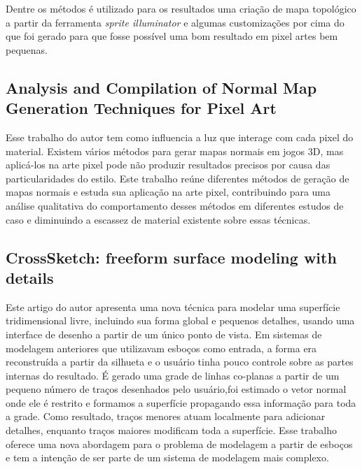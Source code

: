 Dentre os métodos é utilizado para os resultados uma criação de mapa topológico a partir da ferramenta \textit{sprite illuminator} e algumas customizações por cima do que foi gerado para que fosse possível uma bom resultado em pixel artes bem pequenas.

\subsection{Analysis and Compilation of Normal Map Generation Techniques for Pixel Art}

Esse trabalho do autor  tem como influencia a luz que interage com cada pixel do material. Existem vários métodos para gerar mapas normais em jogos 3D, mas aplicá-los na arte pixel pode não produzir resultados precisos por causa das particularidades do estilo. Este trabalho reúne diferentes métodos de geração de mapas normais e estuda sua aplicação na arte pixel, contribuindo para uma análise qualitativa do comportamento desses métodos em diferentes estudos de caso e diminuindo a escassez de material existente sobre essas técnicas.

\subsection{CrossSketch: freeform surface modeling with details}

Este artigo do autor  apresenta uma nova técnica para modelar uma superfície tridimensional livre, incluindo sua forma global e pequenos detalhes, usando uma interface de desenho a partir de um único ponto de vista. Em sistemas de modelagem anteriores que utilizavam esboços como entrada, a forma era reconstruída a partir da silhueta e o usuário tinha pouco controle sobre as partes internas do resultado. É gerado uma grade de linhas co-planas a partir de um pequeno número de traços desenhados pelo usuário,foi estimado o vetor normal onde ele é restrito e formamos a superfície propagando essa informação para toda a grade. Como resultado, traços menores atuam localmente para adicionar detalhes, enquanto traços maiores modificam toda a superfície. Esse trabalho oferece uma nova abordagem para o problema de modelagem a partir de esboços e tem a intenção de ser parte de um sistema de modelagem mais complexo.
